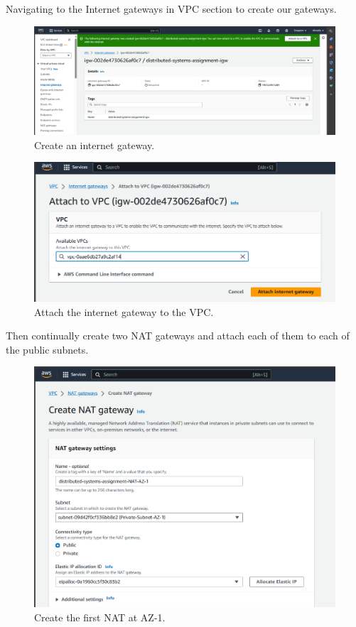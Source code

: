 \documentclass{article}
\begin{document}
Navigating to the Internet gateways in VPC section to create our gateways.\par

\begin{figure}[h]
    \centering
    \includegraphics[width=12cm]{Pictures/Networking and Security/igw_create.png}
    \caption{Create an internet gateway.}
    \label{fig:enter-label}
\end{figure}

\begin{figure}[h]
    \centering
    \includegraphics[width=12cm]{Pictures/Networking and Security/igw_attach.png}
    \caption{Attach the internet gateway to the VPC.}
    \label{fig:enter-label}
\end{figure}

\newpage
Then continually create two NAT gateways and attach each of them to each of the public subnets.\par

\begin{figure}[!htp]
    \centering
    \includegraphics[width=12cm]{Pictures/Networking and Security/NAT_create_1.png}
    \caption{Create the first NAT at AZ-1.}
    \label{fig:enter-label}
\end{figure}
\end{document}

